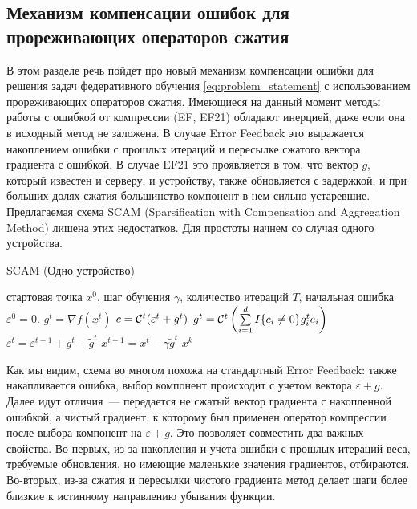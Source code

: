 \subsection{Механизм компенсации ошибок для прореживающих операторов сжатия}
    В этом разделе речь пойдет про новый механизм компенсации ошибки для решения задач федеративного обучения \eqref{eq:problem_statement} с использованием прореживающих операторов сжатия. Имеющиеся на данный момент методы работы с ошибкой от компрессии (EF, EF21) обладают инерцией, даже если она в исходный метод не заложена. В случае Error Feedback это выражается накоплением ошибки с прошлых итераций и пересылке сжатого вектора градиента с ошибкой. В случае EF21 это проявляется в том, что вектор $g$, который известен и серверу, и устройству, также обновляется с задержкой, и при больших долях сжатия большинство компонент в нем сильно устаревшие. Предлагаемая схема SCAM (Sparsification with Compensation and Aggregation Method) лишена этих недостатков. Для простоты начнем со случая одного устройства.

    \begin{algorithm}[ht]
        \caption{SCAM (Одно устройство)}
        \label{alg:scam_single}
        \begin{algorithmic}
             стартовая точка $x^0$, шаг обучения $\gamma$, количество итераций $T$, начальная ошибка $\varepsilon^0 = 0$.
                \STATE $g^t = \nabla f(x^t)$
                \STATE $c = {\cal C}^t (\varepsilon^t + g^t)$
                \STATE $\tilde{g}^t = {\cal C}^t \left(\sum\limits_{i=1}^{d} I\{c_i \neq 0\} g^t_i e_i\right)$
                \STATE $\varepsilon^t = \varepsilon^{t-1} + g^t - \tilde{g}^t$
                \STATE $x^{t+1} = x^t - \gamma \tilde{g}^t$
            \ENDFOR
             $x^k$
        \end{algorithmic}
    \end{algorithm}

    Как мы видим, схема во многом похожа на стандартный Error Feedback: также накапливается ошибка, выбор компонент происходит с учетом вектора $\varepsilon + g$. Далее идут отличия~--- передается не сжатый вектор градиента с накопленной ошибкой, а чистый градиент, к которому был применен оператор компрессии после выбора компонент на $\varepsilon + g$. Это позволяет совместить два важных свойства. Во-первых, из-за накопления и учета ошибки с прошлых итераций веса, требуемые обновления, но имеющие маленькие значения градиентов, отбираются. Во-вторых, из-за сжатия и пересылки чистого градиента метод делает шаги более близкие к истинному направлению убывания функции.

